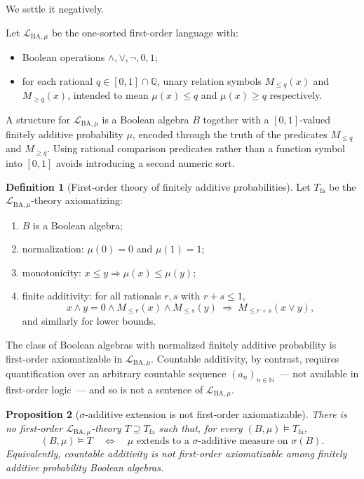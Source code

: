 \documentclass{amsproc}
\newtheorem{proposition}{Proposition}
\theoremstyle{definition}
\newtheorem{definition}[proposition]{Definition}
\newcommand{\Lmu}{\mathcal{L}_{\mathrm{BA},\mu}}
\newcommand{\Tfa}{T_{\mathrm{fa}}}
\newcommand{\Q}{\mathbb{Q}}
\newcommand{\N}{\mathbb{N}}
\begin{document}
We settle it negatively.

\medskip

Let $\Lmu$ be the one-sorted first-order language with:
\begin{itemize}
  \item Boolean operations $\wedge, \vee, \neg, 0, 1$;
  \item for each rational $q \in [0,1] \cap \Q$, unary relation symbols
        $M_{\leq q}(x)$ and $M_{\geq q}(x)$, intended to mean
        $\mu(x) \leq q$ and $\mu(x) \geq q$ respectively.
\end{itemize}

A structure for $\Lmu$ is a Boolean algebra $B$ together with a
$[0,1]$-valued finitely additive probability $\mu$, encoded through the
truth of the predicates $M_{\leq q}$ and $M_{\geq q}$.  Using rational
comparison predicates rather than a function symbol into $[0,1]$ avoids
introducing a second numeric sort.

\begin{definition}[First-order theory of finitely additive probabilities]
\label{def:Tfa}
Let $\Tfa$ be the $\Lmu$-theory axiomatizing:
\begin{enumerate}[label=(\roman*)]
  \item $B$ is a Boolean algebra;
  \item normalization: $\mu(0) = 0$ and $\mu(1) = 1$;
  \item monotonicity: $x \leq y \Rightarrow \mu(x) \leq \mu(y)$;
  \item finite additivity: for all rationals $r, s$ with $r + s \leq 1$,
        \[
          x \wedge y = 0 \wedge M_{\leq r}(x) \wedge M_{\leq s}(y)
          \;\Rightarrow\; M_{\leq r+s}(x \vee y),
        \]
        and similarly for lower bounds.
\end{enumerate}
\end{definition}

\noindent
The class of Boolean algebras with normalized finitely additive probability
is first-order axiomatizable in $\Lmu$.  Countable additivity, by contrast,
requires quantification over an arbitrary countable sequence
$(a_n)_{n \in \N}$~--- not available in first-order logic~--- and so is not
a sentence of $\Lmu$.

\medskip

\begin{proposition}[$\sigma$-additive extension is not first-order
axiomatizable]
\label{prop:not-fo}
There is no first-order $\Lmu$-theory $T \supseteq \Tfa$ such that, for
every $(B, \mu) \models \Tfa$,
\[
  (B, \mu) \models T \quad\Longleftrightarrow\quad
  \mu \text{ extends to a $\sigma$-additive measure on } \sigma(B).
\]
Equivalently, countable additivity is not first-order axiomatizable among
finitely additive probability Boolean algebras.
\end{proposition}
\end{document}
